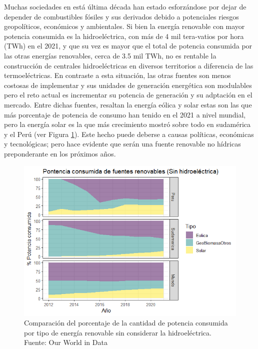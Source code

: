 Muchas sociedades en está última década han estado esforzándose por dejar de depender de combustibles
fósiles y sus derivados debido a potenciales riesgos geopolíticos, económicos y ambientales. 
Si bien la energía renovable con mayor potencia consumida es la hidroeléctrica, con más de 4 mil tera-vatios por hora (TWh) en el 2021, y que su vez
es mayor que el total de potencia consumida por las otras energías renovables, cerca de 3.5 mil TWh, no es rentable la construcción de centrales 
hidroeléctricas en diversos territorios a diferencia de las termoeléctricas. En contraste a esta situación, las otras fuentes son menos costosas de implementar y sus unidades
de generación energética son modulables pero el reto actual es incrementar su potencia de generación y su adptación en el mercado. Entre dichas fuentes, resaltan la energía eólica y solar 
estas son las que más porcentaje de potencia de consumo han tenido  en el 2021 a nivel mundial, pero la energía solar es la que más crecimiento mostró sobre todo en sudamérica y el Perú
 (ver Figura \ref{img:PorcentajeRenovable}). Este hecho puede deberse a causas políticas, económicas y tecnológicas; pero hace evidente que serán una fuente renovable no hídricas preponderante en los próximos años. 

\begin{figure}[h]
    \includegraphics[scale=0.8]{img/PorcentajeRenovable.png}
    \caption{Comparación del porcentaje de la cantidad de potencia consumida por tipo de energía renovable sin considerar la hidroeléctrica.
    Fuente: Our World in Data \cite{owidenergy}}
    \label{img:PorcentajeRenovable}
\end{figure}

